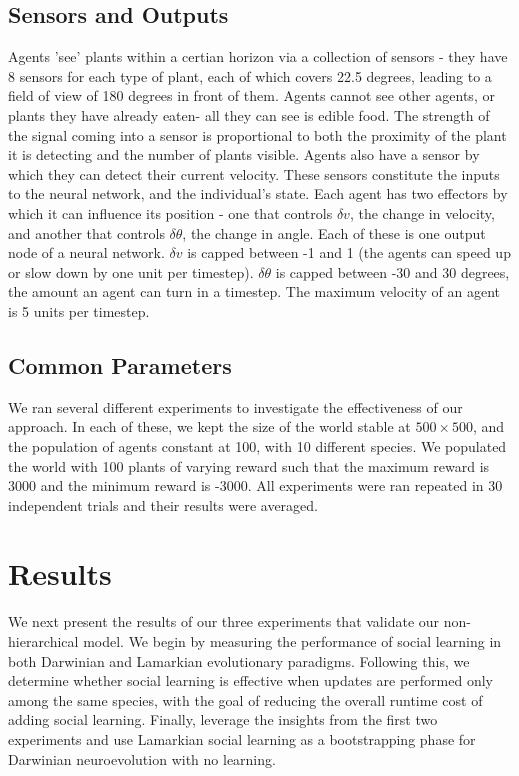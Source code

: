 \documentclass{acm_proc_article-sp}
\begin{document}
\subsection*{Sensors and Outputs} 
  Agents 'see' plants within a certian horizon via a collection of sensors - they have 8 sensors for each type of plant, each of which covers 22.5 degrees, leading to a field of view of 180 degrees in front of them.  Agents cannot see other agents, or plants they have already eaten- all they can see is edible food.  The strength of the signal coming into a sensor is proportional to both the proximity of the plant it is detecting and the number of plants visible.
   Agents also have a sensor by which they can detect their current velocity. These sensors constitute the inputs to the neural network, and the individual's state. Each agent has two effectors by which it can influence its position - one that controls $\delta v$, the change in velocity, and another that controls $\delta \theta$, the change in angle.
Each of these is one output node of a neural network. $\delta v$ is capped between -1 and 1 (the agents can speed up or slow down by one unit per timestep).  $\delta \theta$ is capped between -30 and 30 degrees, the amount an agent can turn in a timestep.  The maximum velocity of an agent is 5 units per timestep.

\subsection*{Common Parameters} 
We ran several different experiments to investigate the effectiveness of our approach.
In each of these, we kept the size of the world stable at $500\times500$, and the population of agents constant at 100, with 10 different species.
We populated the world with 100 plants of varying reward such that the maximum reward is 3000 and the minimum reward is -3000.
All experiments were ran repeated in 30 independent trials and their results were averaged.

\section{Results}
\label{sec:results}
We next present the results of our three experiments that validate our non-hierarchical model. We begin by measuring the performance of social learning in both Darwinian and Lamarkian evolutionary paradigms. Following this, we determine whether social learning is effective when updates are performed only among the same species, with the goal of reducing the overall runtime cost of adding social learning. Finally, leverage the insights from the first two experiments and use Lamarkian social learning as a bootstrapping phase for Darwinian neuroevolution with no learning.
\end{document}
